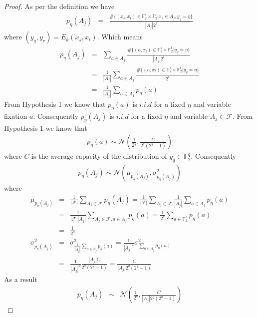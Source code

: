 \begin{proof} As per the definition we have
\begin{eqnarray*}
p_{\eta}(A_j) &=& \frac{\# \lbrace (x_s,x_t) \in \mathbb{F}_{2}^{s} \times \mathbb{F}_{2}^{t}|x_s \in A_j, y_q = \eta \rbrace }{|A_j|2^t}
\end{eqnarray*} where $(y_q,y_r) = E_k(x_s,x_t)$. Which means
\begin{eqnarray*}
p_{\eta}(A_j) &=& \displaystyle\sum_{a \in A_j}\frac{\# \lbrace (a,x_t) \in \mathbb{F}_{2}^{s} \times \mathbb{F}_{2}^{t}| y_q = \eta \rbrace }{|A_j|2^t}\\
&=& \frac{1}{|A_j|}\displaystyle\sum_{a \in A_j}\frac{\# \lbrace (a,x_t) \in \mathbb{F}_{2}^{s} \times \mathbb{F}_{2}^{t}| y_q = \eta \rbrace }{2^t}\\
&=& \frac{1}{|A_j|}\displaystyle\sum_{a \in A_j}p_{\eta}(a)
\end{eqnarray*} From Hypothesis 1 we know that $p_{\eta}(a)$ is $i.i.d$ for a fixed $\eta$ and variable fixation $a$. Consequently $p_{\eta}(A_j)$ is $i.i.d$ for a fixed $\eta$ and variable $A_j \in \mathcal{F}$. From Hypothesis 1 we know that 
\begin{eqnarray*}
p_{\eta}(a) \sim \mathcal{N}\left(\frac{1}{2^q},\frac{C}{2^q(2^q-1)}\right)
\end{eqnarray*}where $C$ is the average capacity of the distribution of $y_q \in \mathbb{F}_{2}^{q}$. Consequently 
\begin{eqnarray*}
p_{\eta}(A_j) \sim \mathcal{N}\left(\mu_{p_{\eta}(A_j)},\sigma^{2}_{p_{\eta}(A_j)}\right)
\end{eqnarray*}
where
\begin{eqnarray*}
\mu_{p_{\eta}(A_j)} &=& \frac{1}{|\mathcal{F}|}\displaystyle\sum_{A_j \in \mathcal{F}}p_{\eta}(A_j)= \frac{1}{|\mathcal{F}|}\displaystyle\sum_{A_j \in \mathcal{F}}\frac{1}{|A_j|}\displaystyle\sum_{a \in A_j}p_{\eta}(a)\\
&=& \frac{1}{|\mathcal{F}||A_j|}\displaystyle\sum_{A_j \in \mathcal{F},a \in A_j}p_{\eta}(a)=\frac{1}{2^s}\displaystyle\sum_{a \in \mathbb{F}_{2}^{s}}p_{\eta}(a)\\
&=& \frac{1}{2^q}\\
\sigma^2_{p_{\eta}(A_j)}&=&\sigma^2_{\frac{1}{|A_j|}\displaystyle\sum_{a \in A_j}p_{\eta}(a)} = \frac{1}{|A_j|^2}\sigma^2_{\displaystyle\sum_{a \in A_j}p_{\eta}(a)}\\
&=&\frac{1}{|A_j|^2}\frac{|A_j|C}{2^q(2^q-1)}=\frac{C}{|A_j|2^q(2^q-1)}
\end{eqnarray*}As a result 
\begin{eqnarray*}
p_{\eta}(A_j) &\sim & \mathcal{N}\left(\frac{1}{2^q},\frac{C}{|A_j|2^q(2^q-1)}\right)
\end{eqnarray*}
\end{proof}
